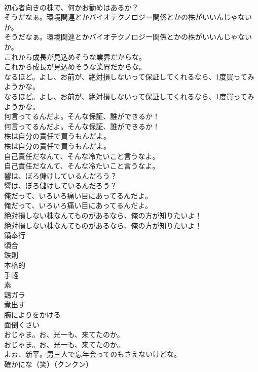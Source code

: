 \documentclass[8pt]{extreport}
\begin{document}
\begin{CJK}{UTF8}{min}
\\	初心者向きの株で、何かお勧めはあるか？ 
\\	そうだなぁ。環境関連とかバイオテクノロジー関係とかの株がいいんじゃないか。	
\\	そうだなぁ。環境関連とかバイオテクノロジー関係とかの株がいいんじゃないか。 
\\	これから成長が見込めそうな業界だからな。	
\\	これから成長が見込めそうな業界だからな。 
\\	なるほど。よし、お前が、絶対損しないって保証してくれるなら、1度買ってみようかな。	
\\	なるほど。よし、お前が、絶対損しないって保証してくれるなら、1度買ってみようかな。 
\\	何言ってるんだよ。そんな保証、誰ができるか！	
\\	何言ってるんだよ。そんな保証、誰ができるか！ 
\\	株は自分の責任で買うもんだよ。	
\\	株は自分の責任で買うもんだよ。 
\\	自己責任だなんて、そんな冷たいこと言うなよ。	
\\	自己責任だなんて、そんな冷たいこと言うなよ。 
\\	響は、ぼろ儲けしているんだろう？	
\\	響は、ぼろ儲けしているんだろう？ 
\\	俺だって、いろいろ痛い目にあってるんだよ。	
\\	俺だって、いろいろ痛い目にあってるんだよ。 
\\	絶対損しない株なんてものがあるなら、俺の方が知りたいよ！	
\\	絶対損しない株なんてものがあるなら、俺の方が知りたいよ！ 
\\	鍋奉行
\\	頃合
\\	鉄則
\\	本格的
\\	手軽
\\	素
\\	鶏ガラ
\\	煮出す
\\	腕によりをかける
\\	面倒くさい
\\	おじゃま。お、光一も、来てたのか。	
\\	おじゃま。お、光一も、来てたのか。 
\\	よぉ、新平。男三人で忘年会ってのもさえないけどな。	
\\	確かにな（笑）（クンクン）	

\end{CJK}
\end{document}
